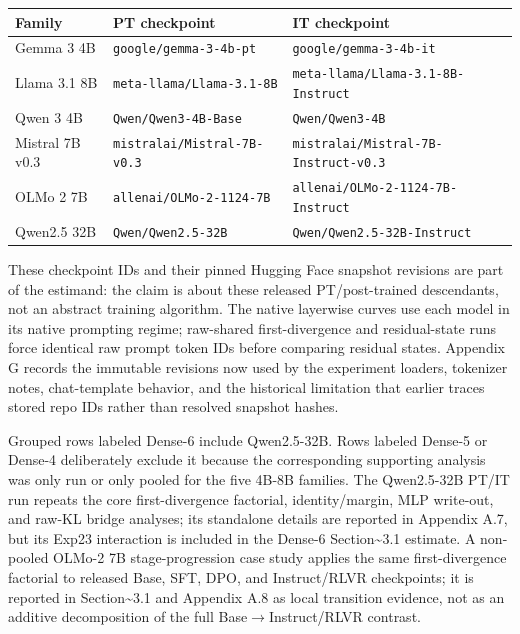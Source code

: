 \documentclass[11pt]{article}
\begin{document}
\begin{table}[t]
\centering
\small
\setlength{\tabcolsep}{3pt}
\begin{tabularx}{\linewidth}{@{}>{\raggedright\arraybackslash}X >{\raggedright\arraybackslash}X >{\raggedright\arraybackslash}X@{}}
\toprule
Family & PT checkpoint & IT checkpoint \\
\midrule
Gemma 3 4B & \texttt{google/gemma-3-4b-pt} & \texttt{google/gemma-3-4b-it} \\
Llama 3.1 8B & \texttt{meta-llama/Llama-3.1-8B} & \texttt{meta-llama/Llama-3.1-8B-Instruct} \\
Qwen 3 4B & \texttt{Qwen/Qwen3-4B-Base} & \texttt{Qwen/Qwen3-4B} \\
Mistral 7B v0.3 & \texttt{mistralai/Mistral-7B-v0.3} & \texttt{mistralai/Mistral-7B-Instruct-v0.3} \\
OLMo 2 7B & \texttt{allenai/OLMo-2-1124-7B} & \texttt{allenai/OLMo-2-1124-7B-Instruct} \\
Qwen2.5 32B & \texttt{Qwen/Qwen2.5-32B} & \texttt{Qwen/Qwen2.5-32B-Instruct} \\
\bottomrule
\end{tabularx}
\end{table}

These checkpoint IDs and their pinned Hugging Face snapshot revisions are part of the estimand: the claim is about these released PT/post-trained descendants, not an abstract training algorithm. The native layerwise curves use each model in its native prompting regime; raw-shared first-divergence and residual-state runs force identical raw prompt token IDs before comparing residual states. Appendix G records the immutable revisions now used by the experiment loaders, tokenizer notes, chat-template behavior, and the historical limitation that earlier traces stored repo IDs rather than resolved snapshot hashes.

Grouped rows labeled Dense-6 include Qwen2.5-32B. Rows labeled Dense-5 or Dense-4 deliberately exclude it because the corresponding supporting analysis was only run or only pooled for the five 4B-8B families. The Qwen2.5-32B PT/IT run repeats the core first-divergence factorial, identity/margin, MLP write-out, and raw-KL bridge analyses; its standalone details are reported in Appendix A.7, but its Exp23 interaction is included in the Dense-6 Section\textasciitilde{}3.1 estimate. A non-pooled OLMo-2 7B stage-progression case study applies the same first-divergence factorial to released Base, SFT, DPO, and Instruct/RLVR checkpoints; it is reported in Section\textasciitilde{}3.1 and Appendix A.8 as local transition evidence, not as an additive decomposition of the full Base\ensuremath{\to}Instruct/RLVR contrast.
\end{document}
